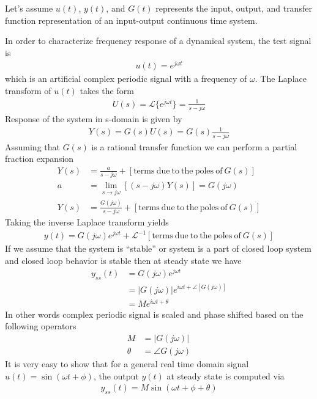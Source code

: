\documentclass{article}
\begin{document}
\thispagestyle{empty}
\begin{center}
\end{center}
\bigskip

Let's assume $u(t)$, $y(t)$, and $G(t)$ represents the input, output,
and transfer function representation of an input-output continuous time
system.

In order to characterize frequency response of a dynamical system,
the test signal is 
%
\begin{align*}
 u(t) = e^{j \omega t}
\end{align*}
%
which is an artificial complex periodic signal with a 
frequency of $\omega$. The Laplace transform of $u(t)$ takes the
form
%
\begin{align*}
 U(s) = \mathcal{L} \lbrace e^{j \omega t} \rbrace = \frac{1}{s - j \omega}
\end{align*}
%
Response of the system in s-domain is given by
%
%
\begin{align*}
 Y(s) = G(s) U(s) = G(s) \frac{1}{s - j \omega}
\end{align*}
%
Assuming that $G(s)$ is a rational transfer function
we can perform a partial fraction expansion
%
\begin{align*}
     Y(s) &= \frac{a}{s -  j \omega} + \left[ \mathrm{terms \ due \
  to \ the \ poles \ of} \  G(s) \right] 
\\
a &= \lim_{s \to j \omega} \left[ (s - j \omega) Y(s)
  \right]  = G(j \omega)
\\
Y(s) &=  \frac{G(j \omega)}{s -  j \omega} + \left[ \mathrm{terms \ due \
  to \ the \ poles \ of} \  G(s) \right]  
\end{align*}
%
Taking the inverse Laplace transform yields
%
\begin{align*}
  y(t) = G(j \omega) e^{j \omega t} + \mathcal{L}^{-1} \left[ \mathrm{terms \ due \
  to \ the \ poles \ of} \  G(s) \right]  
\end{align*}
%
If we assume that the system is ``stable'' or system is a part of
closed loop system and closed loop behavior is stable then
at steady state we have
%
\begin{align*}
y_{ss}(t) &= G(j \omega) e^{j \omega t} \\
&= | G(j \omega) | e^{i \omega t + \angle [ G(j \omega) ] }
\\
&= M e^{i \omega t + \theta}
\end{align*}
%
In other words complex periodic signal is scaled and phase shifted
based on the following operators
%
\begin{align*}
M &= | G(j \omega) | \\
\theta &= \angle G(j \omega)
\end{align*}
%
It is very easy to show that for a general real time domain signal
$u(t) = \sin (\omega t + \phi)$, the output $y(t)$ at steady state 
is computed via
%
\begin{align*}
  y_{ss}(t) = M \sin(\omega t + \phi + \theta)
\end{align*}
%
\end{document}
